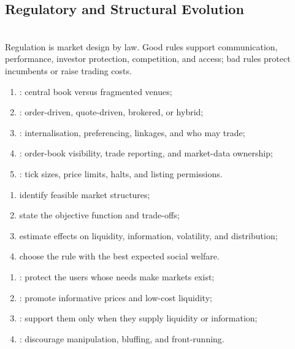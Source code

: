 \subsection{Regulatory and Structural Evolution}

\begin{principle} \\
Regulation is market design by law. Good rules support communication, performance, investor protection, competition, and access; bad rules protect incumbents or raise trading costs.
\end{principle}

\begin{taxonomy} 
\begin{enumerate}[label=\roman*.]
\setlength{\itemsep}{0pt}
\item {}: central book versus fragmented venues;
\item {}: order-driven, quote-driven, brokered, or hybrid;
\item {}: internalisation, preferencing, linkages, and who may trade;
\item {}: order-book visibility, trade reporting, and market-data ownership;
\item {}: tick sizes, price limits, halts, and listing permissions.
\end{enumerate}
\end{taxonomy}

\begin{process} 
\begin{enumerate}[label=\roman*.]
\setlength{\itemsep}{0pt}
\item identify feasible market structures;
\item state the objective function and trade-offs;
\item estimate effects on liquidity, information, volatility, and distribution;
\item choose the rule with the best expected social welfare.
\end{enumerate}
\end{process}

\begin{taxonomy} 
\begin{enumerate}[label=\roman*.]
\setlength{\itemsep}{0pt}
\item {}: protect the users whose needs make markets exist;
\item {}: promote informative prices and low-cost liquidity;
\item {}: support them only when they supply liquidity or information;
\item {}: discourage manipulation, bluffing, and front-running.
\end{enumerate}
\end{taxonomy}

